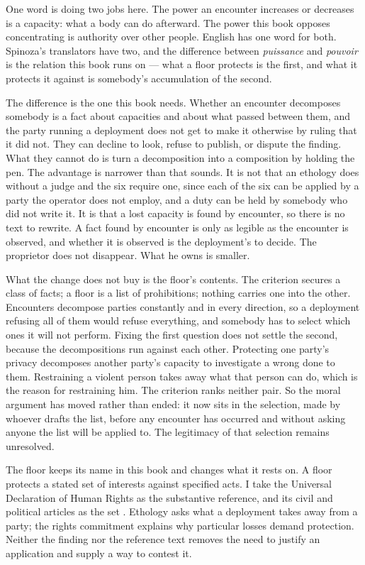 One word is doing two jobs here. The power an encounter increases or decreases is a capacity: what a body can do afterward. The power this book opposes concentrating is authority over other people. English has one word for both. Spinoza's translators have two, and the difference between \emph{puissance} and \emph{pouvoir} is the relation this book runs on — what a floor protects is the first, and what it protects it against is somebody's accumulation of the second.

The difference is the one this book needs. Whether an encounter decomposes somebody is a fact about capacities and about what passed between them, and the party running a deployment does not get to make it otherwise by ruling that it did not. They can decline to look, refuse to publish, or dispute the finding. What they cannot do is turn a decomposition into a composition by holding the pen. The advantage is narrower than that sounds. It is not that an ethology does without a judge and the six require one, since each of the six can be applied by a party the operator does not employ, and a duty can be held by somebody who did not write it. It is that a lost capacity is found by encounter, so there is no text to rewrite. A fact found by encounter is only as legible as the encounter is observed, and whether it is observed is the deployment's to decide. The proprietor does not disappear. What he owns is smaller.

What the change does not buy is the floor's contents. The criterion secures a class of facts; a floor is a list of prohibitions; nothing carries one into the other. Encounters decompose parties constantly and in every direction, so a deployment refusing all of them would refuse everything, and somebody has to select which ones it will not perform. Fixing the first question does not settle the second, because the decompositions run against each other. Protecting one party's privacy decomposes another party's capacity to investigate a wrong done to them. Restraining a violent person takes away what that person can do, which is the reason for restraining him. The criterion ranks neither pair. So the moral argument has moved rather than ended: it now sits in the selection, made by whoever drafts the list, before any encounter has occurred and without asking anyone the list will be applied to. The legitimacy of that selection remains unresolved.

The floor keeps its name in this book and changes what it rests on. A floor protects a stated set of interests against specified acts. I take the Universal Declaration of Human Rights as the substantive reference, and its civil and political articles as the set \autocite{un1948udhr}. Ethology asks what a deployment takes away from a party; the rights commitment explains why particular losses demand protection. Neither the finding nor the reference text removes the need to justify an application and supply a way to contest it.

